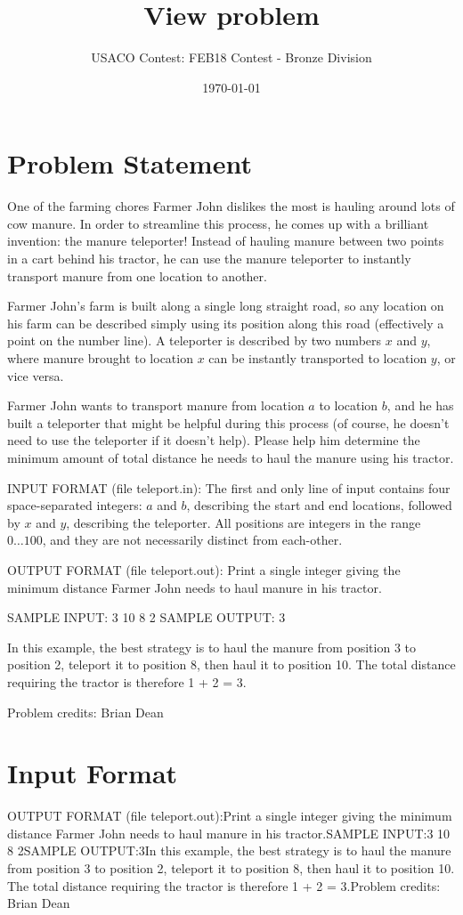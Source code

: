 \documentclass[12pt]{article}
\title{View problem}
\author{USACO Contest: FEB18 Contest - Bronze Division}
\date{\today}
\begin{document}
\maketitle

\section*{Problem Statement}

One of the farming chores Farmer John dislikes the most is hauling around lots
of cow manure.  In order to streamline this process, he comes up with a
brilliant invention: the manure teleporter!  Instead of hauling manure between
two points in a cart behind his tractor, he can use the manure teleporter to
instantly transport manure from  one location to another.

Farmer John's farm is built along a single long straight road, so any location
on his farm can be described simply using its position along this road
(effectively a point on the number line).  A teleporter is described by two
numbers $x$ and $y$, where manure brought to location $x$ can be instantly
transported to location $y$, or vice versa. 

Farmer John wants to transport manure from location $a$ to location $b$, and he
has built a teleporter that might be helpful during this process (of course, he
doesn't need to use the teleporter if it doesn't help).  Please help him
determine the minimum amount of total distance he needs to haul the manure using
his tractor.

INPUT FORMAT (file teleport.in):
The first and only line of input contains four space-separated integers: $a$ and $b$, describing the start and end locations, followed by $x$ and $y$, describing the teleporter. All positions are integers in the range
$0 \ldots 100$, and they are not necessarily distinct from each-other.

OUTPUT FORMAT (file teleport.out):
Print a single integer giving the minimum distance Farmer John needs to haul
manure in his tractor.

SAMPLE INPUT:
3 10 8 2
SAMPLE OUTPUT: 
3

In this example, the best strategy is to haul the manure from position 3 to
position 2, teleport it to position 8, then haul it to position 10.   The total
distance requiring the tractor is therefore 1 + 2 = 3.


Problem credits: Brian Dean



\section*{Input Format}
OUTPUT FORMAT (file teleport.out):Print a single integer giving the minimum distance Farmer John needs to haul
manure in his tractor.SAMPLE INPUT:3 10 8 2SAMPLE OUTPUT:3In this example, the best strategy is to haul the manure from position 3 to
position 2, teleport it to position 8, then haul it to position 10.   The total
distance requiring the tractor is therefore 1 + 2 = 3.Problem credits: Brian Dean
\end{document}
